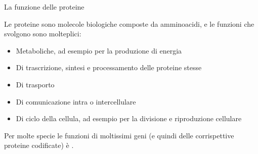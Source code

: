 \documentclass{beamer}
\begin{document}
\begin{tframe}{La funzione delle proteine}


      Le proteine sono molecole biologiche composte da amminoacidi, e le funzioni che svolgono sono molteplici:
	   \begin{itemize}	
	   \item Metaboliche, ad esempio per la produzione di energia
	   \onslide<3->
		\item Di trascrizione, sintesi e processamento delle proteine stesse
		\onslide<4->		
		\item Di trasporto
		\onslide<5->
		\item Di comunicazione intra o intercellulare
		\onslide<6->
		\item Di ciclo della cellula, ad esempio per la divisione e riproduzione cellulare
      \end{itemize}
      Per molte specie le funzioni di moltissimi geni (e quindi delle corrispettive proteine codificate) è .

\end{tframe}
\end{document}
